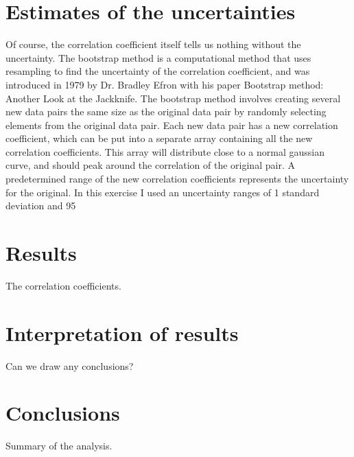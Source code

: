 \documentclass[aps,prl,reprint,groupedaddress]{revtex4-1}
\begin{document}
\section{Estimates of the uncertainties}
	Of course, the correlation coefficient itself tells us nothing without the uncertainty. The bootstrap method is a computational method that uses resampling to find the uncertainty of the correlation coefficient, and was introduced in 1979 by Dr. Bradley Efron with his paper Bootstrap method: Another Look at the Jackknife. The bootstrap method involves creating several new data pairs the same size as the original data pair by randomly selecting elements from the original data pair. Each new data pair has a new correlation coefficient, which can be put into a separate array containing all the new correlation coefficients. This array will distribute close to a normal gaussian curve, and should peak around the correlation of the original pair. A predetermined range of the new correlation coefficients represents the uncertainty for the original. In this exercise I used an uncertainty ranges of 1 standard deviation and 95%

\section{Results}
The correlation coefficients.

\section{Interpretation of results}
Can we draw any conclusions?

\section{Conclusions}
Summary of the analysis.



\end{document}
